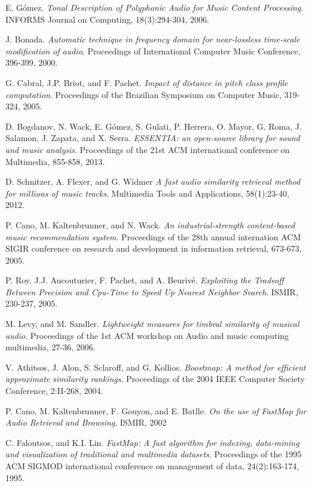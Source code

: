 \documentclass[11pt, oneside]{Thesis} %
\begin{document}
\begin{thebibliography}{99}
E. Gómez.
\textit{Tonal Description of Polyphonic Audio for Music Content Processing}.
INFORMS Journal on Computing, 18(3):294-304, 2006.

J. Bonada.
\textit{Automatic technique in frequency domain for near-lossless time-scale modification of audio}.
Proceedings of International Computer Music Conference, 396-399, 2000.

G. Cabral, J.P. Briot, and F. Pachet. 
\textit{Impact of distance in pitch class profile computation}.
Proceedings of the Brazilian Symposium on Computer Music, 319-324, 2005.

D. Bogdanov, N. Wack, E. Gómez, S. Gulati, P. Herrera, O. Mayor, G. Roma, J. Salamon, J. Zapata, and X. Serra.
\textit{ESSENTIA: an open-source library for sound and music analysis}.
Proceedings of the 21st ACM international conference on Multimedia, 855-858, 2013.

D. Schnitzer, A. Flexer, and G. Widmer
\textit{A fast audio similarity retrieval method for millions of music tracks}.
Multimedia Tools and Applications, 58(1):23-40, 2012.

P. Cano, M. Kaltenbrunner, and N. Wack.
\textit{An industrial-strength content-based music recommendation system}.
Proceedings of the 28th annual internation ACM SIGIR conference on research and development in information retrieval, 673-673, 2005.


P. Roy, J.J. Aucouturier, F. Pachet, and A. Beurivé.
\textit{Exploiting the Tradeoff Between Precision and Cpu-Time to Speed Up Nearest Neighbor Search}.
ISMIR, 230-237, 2005.

M. Levy, and M. Sandler.
\textit{Lightweight measures for timbral similarity of musical audio}.
Proceedings of the 1st ACM workshop on Audio and music computing multimedia, 27-36, 2006.

V. Athitsos, J. Alon, S. Sclaroff, and G. Kollios.
\textit{Boostmap: A method for efficient approximate similarity rankings}.
Proceedings of the 2004 IEEE Computer Society Conference, 2:II-268, 2004.

P. Cano, M. Kaltenbrunner, F. Gouyon, and E. Batlle.
\textit{On the use of FastMap for Audio Retrieval and Browsing}.
ISMIR, 2002

C. Faloutsos, and K.I. Lin. 
\textit{FastMap: A fast algorithm for indexing, data-mining and visualization of traditional and multimedia datasets}.
Proceedings of the 1995 ACM SIGMOD international conference on management of data, 24(2):163-174, 1995.

\end{thebibliography}


\end{document}
